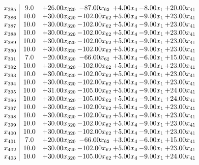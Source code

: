 \documentclass[8pt]{article}
\begin{document}
\[\begin{array}{c| c c@{\hskip 2pt} c@{\hskip 2pt} c@{\hskip 2pt} c@{\hskip 2pt} c@{\hskip 2pt} }
 x_{385}   &  9.0 & + 26.00 x_{320} & -87.00 x_{62} & +  4.00 x_{4} & -8.00 x_{1} & + 20.00 x_{41}\\
 x_{386}   &  10.0 & + 30.00 x_{320} & -102.00 x_{62} & +  5.00 x_{4} & -9.00 x_{1} & + 23.00 x_{41}\\
 x_{387}   &  10.0 & + 30.00 x_{320} & -102.00 x_{62} & +  5.00 x_{4} & -9.00 x_{1} & + 23.00 x_{41}\\
 x_{388}   &  10.0 & + 30.00 x_{320} & -102.00 x_{62} & +  5.00 x_{4} & -9.00 x_{1} & + 23.00 x_{41}\\
 x_{389}   &  10.0 & + 30.00 x_{320} & -102.00 x_{62} & +  5.00 x_{4} & -9.00 x_{1} & + 23.00 x_{41}\\
 x_{390}   &  10.0 & + 30.00 x_{320} & -102.00 x_{62} & +  5.00 x_{4} & -9.00 x_{1} & + 23.00 x_{41}\\
 x_{391}   &  7.0 & + 20.00 x_{320} & -66.00 x_{62} & +  3.00 x_{4} & -6.00 x_{1} & + 15.00 x_{41}\\
 x_{392}   &  10.0 & + 30.00 x_{320} & -102.00 x_{62} & +  5.00 x_{4} & -9.00 x_{1} & + 23.00 x_{41}\\
 x_{393}   &  10.0 & + 30.00 x_{320} & -102.00 x_{62} & +  5.00 x_{4} & -9.00 x_{1} & + 23.00 x_{41}\\
 x_{394}   &  10.0 & + 30.00 x_{320} & -102.00 x_{62} & +  5.00 x_{4} & -9.00 x_{1} & + 23.00 x_{41}\\
 x_{395}   &  10.0 & + 31.00 x_{320} & -105.00 x_{62} & +  5.00 x_{4} & -9.00 x_{1} & + 24.00 x_{41}\\
 x_{396}   &  10.0 & + 30.00 x_{320} & -105.00 x_{62} & +  5.00 x_{4} & -9.00 x_{1} & + 24.00 x_{41}\\
 x_{397}   &  10.0 & + 30.00 x_{320} & -102.00 x_{62} & +  5.00 x_{4} & -9.00 x_{1} & + 23.00 x_{41}\\
 x_{398}   &  10.0 & + 30.00 x_{320} & -102.00 x_{62} & +  5.00 x_{4} & -9.00 x_{1} & + 23.00 x_{41}\\
 x_{399}   &  10.0 & + 30.00 x_{320} & -102.00 x_{62} & +  5.00 x_{4} & -9.00 x_{1} & + 23.00 x_{41}\\
 x_{400}   &  10.0 & + 30.00 x_{320} & -102.00 x_{62} & +  5.00 x_{4} & -9.00 x_{1} & + 23.00 x_{41}\\
 x_{401}   &  7.0 & + 20.00 x_{320} & -66.00 x_{62} & +  3.00 x_{4} & -6.00 x_{1} & + 15.00 x_{41}\\
 x_{402}   &  10.0 & + 30.00 x_{320} & -102.00 x_{62} & +  5.00 x_{4} & -9.00 x_{1} & + 23.00 x_{41}\\
 x_{403}   &  10.0 & + 30.00 x_{320} & -105.00 x_{62} & +  5.00 x_{4} & -9.00 x_{1} & + 24.00 x_{41}\\

\end{array}\]
\end{document}

